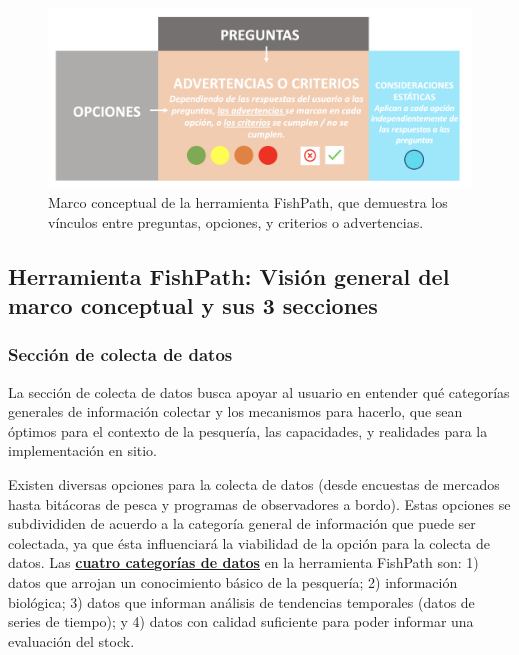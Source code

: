 \documentclass[
  11pt,
]{book}
\begin{document}
\begin{figure}
 
 {\centering \includegraphics[width=0.95\linewidth]{images/conceptual-framework-es} 
 
 }
 
 \caption{Marco conceptual de la herramienta FishPath, que demuestra los vínculos entre preguntas, opciones, y criterios o advertencias.}\label{fig:conceptual}
 \end{figure}

\hypertarget{herramienta-fishpath-visiuxf3n-general-del-marco-conceptual-y-sus-3-secciones}{%
\subsection{Herramienta FishPath: Visión general del marco conceptual y sus 3 secciones}\label{herramienta-fishpath-visiuxf3n-general-del-marco-conceptual-y-sus-3-secciones}}

\hypertarget{secciuxf3n-de-colecta-de-datos}{%
\subsubsection{Sección de colecta de datos}\label{secciuxf3n-de-colecta-de-datos}}

La sección de colecta de datos busca apoyar al usuario en entender qué categorías generales de información colectar y los mecanismos para hacerlo, que sean óptimos para el contexto de la pesquería, las capacidades, y realidades para la implementación en sitio.

Existen diversas opciones para la colecta de datos (desde encuestas de mercados hasta bitácoras de pesca y programas de observadores a bordo). Estas opciones se subdivididen de acuerdo a la categoría general de información que puede ser colectada, ya que ésta influenciará la viabilidad de la opción para la colecta de datos. Las \protect\hyperlink{Data-Categories}{\textbf{cuatro categorías de datos}} en la herramienta FishPath son: 1) datos que arrojan un conocimiento básico de la pesquería; 2) información biológica; 3) datos que informan análisis de tendencias temporales (datos de series de tiempo); y 4) datos con calidad suficiente para poder informar una evaluación del stock.
\end{document}
